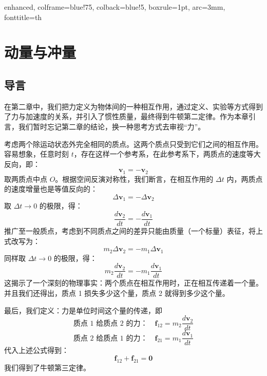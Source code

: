 \usepackage{amsmath, amsthm, amssymb}
\usepackage{tcolorbox}
\usepackage{tikz}
\usetikzlibrary{calc, arrows.meta,positioning}
\usepackage{geometry}
\geometry{left=3cm, right=2.5cm, top=2.5cm, bottom=2.5cm}

%
{enhanced, colframe=blue!75, colback=blue!5, 
	boxrule=1pt, arc=3mm, fonttitle=\bfseries}{th}

\everymath{\displaystyle}


	
	
	
	\chapter{动量与冲量}
	
	\section{导言}
	在第二章中，我们把力定义为物体间的一种相互作用，通过定义、实验等方式得到了力与加速度的关系，并引入了惯性质量，最终得到牛顿第二定律。作为本章引言，我们暂时忘记第二章的结论，换一种思考方式去审视“力”。
	
	考虑两个除运动状态外完全相同的质点。这两个质点只受到它们之间的相互作用。容易想象，任意时刻 $t$，存在这样一个参考系，在此参考系下，两质点的速度等大反向，即：
	\[ \boldsymbol{v}_1 = -\boldsymbol{v}_2 \]
	取两质点中点 $O$。根据空间反演对称性，我们断言，在相互作用的 $\Delta t$ 内，两质点的速度增量也是等值反向的：
	\[ \Delta \boldsymbol{v}_1 = -\Delta \boldsymbol{v}_2 \]
	取 $\Delta t \to 0$ 的极限，得：
	\[ \frac{d\boldsymbol{v}_2}{dt} = -\frac{d\boldsymbol{v}_1}{dt} \]
	推广至一般质点，考虑到不同质点之间的差异只能由质量（一个标量）表征，将上式改写为：
	\[ m_2 \Delta \boldsymbol{v}_2 = -m_1 \Delta \boldsymbol{v}_1 \]
	同样取 $\Delta t \to 0$ 的极限，得：
	\[ m_2 \frac{d\boldsymbol{v}_2}{dt} = -m_1 \frac{d\boldsymbol{v}_1}{dt} \]
	这揭示了一个深刻的物理事实：两个质点在相互作用时，正在相互传递着一个量。并且我们还得出，质点 1 损失多少这个量，质点 2 就得到多少这个量。
	
	最后，我们定义：力是单位时间这个量的传递，即
	\[ \text{质点 1 给质点 2 的力：} \quad \boldsymbol{f}_{12} = m_2 \frac{d\boldsymbol{v}_2}{dt} \]
	\[ \text{质点 2 给质点 1 的力：} \quad \boldsymbol{f}_{21} = m_1 \frac{d\boldsymbol{v}_1}{dt} \]
	代入上述公式得到：
	\[ \boldsymbol{f}_{12} + \boldsymbol{f}_{21} = \boldsymbol{0} \]
	我们得到了牛顿第三定律。
	
